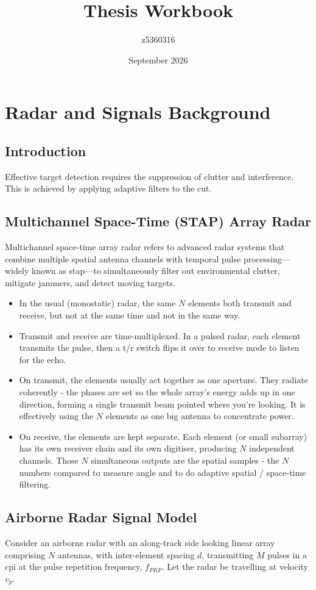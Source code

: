 \documentclass{article}
\title{Thesis Workbook}
\author{z5360316}
\date{September 2026}
\begin{document}
\maketitle

\section{Radar and Signals Background}
\subsection{Introduction}
Effective target detection requires the suppression of clutter and interference. This is achieved by applying adaptive filters to the \gls{cut}.

\subsection{Multichannel Space-Time (STAP) Array Radar}
Multichannel space-time array radar refers to advanced radar systems that combine multiple spatial antenna channels with temporal pulse processing—widely known as \Gls{stap}—to simultaneously filter out environmental clutter, mitigate jammers, and detect moving targets.
\begin{itemize}
    \item In the usual (monostatic) radar, the same $N$ elements both transmit and receive, but not at the same time and not in the same way.
    \item Transmit and receive are time-multiplexed. In a pulsed radar, each element transmits the pulse, then a \gls{t/r} switch flips it over to receive mode to listen for the echo.
    \item On transmit, the elements usually act together as one aperture. They radiate coherently - the phases are set so the whole array's energy adds up in one direction, forming a single transmit beam pointed where you're looking. It is effectively using the $N$ elements as one big antenna to concentrate power.
    \item On receive, the elements are kept separate. Each element (or small subarray) has its own receiver chain and its own digitiser, producing $N$ independent channels. Those $N$ simultaneous outputs are the spatial samples - the $N$ numbers compared to measure angle and to do adaptive spatial / space-time filtering.
\end{itemize}

\subsection{Airborne Radar Signal Model}
Consider an airborne radar with an along-track side looking linear array comprising $N$ antennas, with inter-element spacing $d$, transmitting $M$ pulses in a \gls{cpi} at the pulse repetition frequency, $f_{PRF}$. Let the radar be travelling at velocity $v_p$.  
\end{document}
